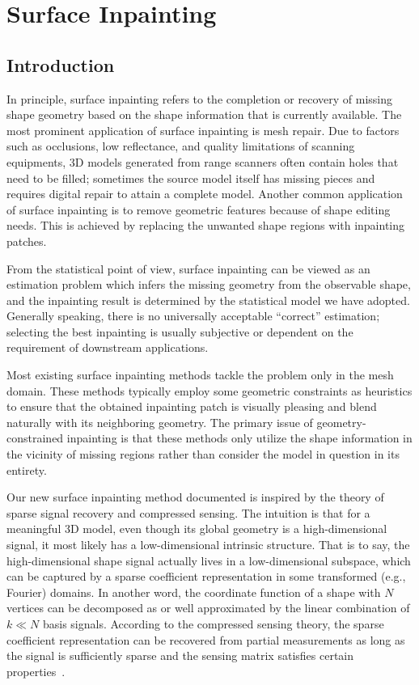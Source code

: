 \chapter{Surface Inpainting}
\label{chap:inpainting}

\section{Introduction}
In principle, surface inpainting refers to the completion or recovery of
missing shape geometry based on the shape information that is currently
available. The most prominent application of surface inpainting is mesh repair.
Due to factors such as occlusions, low reflectance, and quality limitations of
scanning equipments, 3D models generated from range scanners often contain
holes that need to be filled; sometimes the source model itself has missing
pieces and requires digital repair to attain a complete model. Another common
application of surface inpainting is to remove geometric features because of
shape editing needs. This is achieved by replacing the unwanted shape regions
with inpainting patches.

From the statistical point of view, surface inpainting can be viewed as an
estimation problem which infers the missing geometry from the observable shape,
and the inpainting result is determined by the statistical model we have
adopted. Generally speaking, there is no universally acceptable ``correct''
estimation; selecting the best inpainting is usually subjective or dependent on
the requirement of downstream applications.

Most existing surface inpainting methods tackle the problem only in
the mesh domain. These methods typically employ some geometric
constraints as heuristics to ensure that the obtained inpainting patch
is visually pleasing and blend naturally with its neighboring
geometry. The primary issue of geometry-constrained inpainting is that
these methods only utilize the shape information in the vicinity of
missing regions rather than consider the model in question in its
entirety.

Our new surface inpainting method documented is inspired
by the theory of sparse signal recovery and compressed sensing. The
intuition is that for a meaningful 3D model, even though its global
geometry is a high-dimensional signal, it most likely has a
low-dimensional intrinsic structure. That is to say, the
high-dimensional shape signal actually lives in a low-dimensional
subspace, which can be captured by a sparse coefficient representation
in some transformed (e.g., Fourier) domains. In another word, the
coordinate function of a shape with $N$ vertices can be decomposed as or
well approximated by the linear combination of $k\ll N$ basis signals.
According to the compressed sensing theory, the sparse coefficient
representation can be recovered from partial measurements as long as
the signal is sufficiently sparse and the sensing matrix satisfies
certain properties~\cite{Candes2006}.

